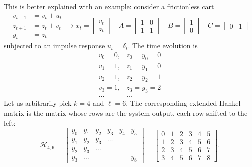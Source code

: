 This is better explained with an example: consider a frictionless cart
\begin{equation*}
  \begin{aligned}
    v_{t+1} &= v_t + u_t \\
    z_{t+1} &= z_t + v_t \\
    y_t &= z_t
  \end{aligned} \longrightarrow
  x_t =
  \begin{bmatrix}
    v_t \\ z_t
  \end{bmatrix}\quad A =
    \begin{bmatrix}
      1 & 0 \\ 1 & 1
    \end{bmatrix}\quad B =
    \begin{bmatrix}
      1 \\ 0
    \end{bmatrix}\quad C =
    \begin{bmatrix}
      0 & 1
    \end{bmatrix}
\end{equation*}
subjected to an impulse response $u_t=\delta_t$. The time evolution is
\begin{equation*}
  \begin{matrix}
    v_0 = 0, & z_0 = y_0 = 0 \\
    v_1 = 1, & z_1 = y_1 = 0 \\
    v_2 = 1, & z_2 = y_2 = 1 \\
    v_3 = 1, & z_3 = y_3 = 2 \\
    \ldots & \ldots
  \end{matrix}
\end{equation*}
Let us arbitrarily pick $k=4$ and $\ell=6$. The corresponding extended Hankel matrix is the matrix whose rows are the system output, each row shifted to the left:
\begin{equation*}
  \mathcal{H}_{4,6} =
  \begin{bmatrix}
    y_0 & y_1 & y_2 & y_3 & y_4 & y_5 \\
    y_1 & y_2 & y_3 & \ldots & & \\
    y_2 & y_3 & \ldots & & & \\
    y_3 & \ldots & & & & y_8
  \end{bmatrix} =
  \begin{bmatrix}
    0 & 1 & 2 & 3 & 4 & 5 \\
    1 & 2 & 3 & 4 & 5 & 6 \\
    2 & 3 & 4 & 5 & 6 & 7 \\
    3 & 4 & 5 & 6 & 7 & 8
  \end{bmatrix}.
\end{equation*}

